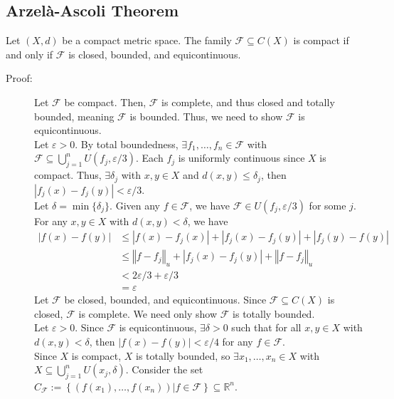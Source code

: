 \documentclass[9pt]{extarticle}
\newcommand{\R}{\mathbb{R}}
\newcommand{\norm}[1]{\left\Vert #1 \right\Vert}
\begin{document}
  \subsection{Arzelà-Ascoli Theorem}%
  Let $(X,d)$ be a compact metric space. The family $\mathcal{F}\subseteq C(X)$ is compact if and only if $\mathcal{F}$ is closed, bounded, and equicontinuous.
  \begin{description}
    \item[Proof:] Let $\mathcal{F}$ be compact. Then, $\mathcal{F}$ is complete, and thus closed and totally bounded, meaning $\mathcal{F}$ is bounded. Thus, we need to show $\mathcal{F}$ is equicontinuous.\\

      Let $\varepsilon > 0$. By total boundedness, $\exists f_1,\dots,f_n\in \mathcal{F}$ with $\mathcal{F}\subseteq \bigcup_{j=1}^{n} U(f_j,\varepsilon/3)$. Each $f_j$ is uniformly continuous since $X$ is compact. Thus, $\exists \delta_j$ with $x,y\in X$ and $d(x,y)\leq \delta_j$, then $|f_j(x)-f_j(y)| < \varepsilon/3$.\\

      Let $\delta = \min\{\delta_j\}$. Given any $f\in \mathcal{F}$, we have $\mathcal{F}\in U(f_j,\varepsilon/3)$ for some $j$. For any $x,y\in X$ with $d(x,y) < \delta$, we have
      \begin{align*}
        |f(x)-f(y)| &\leq |f(x)-f_j(x)| + |f_j(x)-f_j(y)| + |f_j(y)-f(y)|\\
                    &\leq \norm{f-f_j}_u + |f_j(x)-f_j(y)| + \norm{f-f_j}_u\\
                    &< 2\varepsilon/3 + \varepsilon/3\\
                    &= \varepsilon
      \end{align*}
      Let $\mathcal{F}$ be closed, bounded, and equicontinuous. Since $\mathcal{F} \subseteq C(X)$ is closed, $\mathcal{F}$ is complete. We need only show $\mathcal{F}$ is totally bounded.\\

      Let $\varepsilon > 0$. Since $\mathcal{F}$ is equicontinuous, $\exists \delta > 0$ such that for all $x,y\in X$ with $d(x,y) < \delta$, then $|f(x)-f(y)| < \varepsilon/4$ for any $f\in \mathcal{F}$.\\

      Since $X$ is compact, $X$ is totally bounded, so $\exists x_1,\dots,x_n\in X$ with $X\subseteq \bigcup_{j=1}^{n}U(x_j,\delta)$. Consider the set $C_{\mathcal{F}} := \left\{\left(f(x_1),\dots,f(x_n)\right)|f\in\mathcal{F}\right\}\subseteq \R^n$.\\


\end{description}
\end{document}
